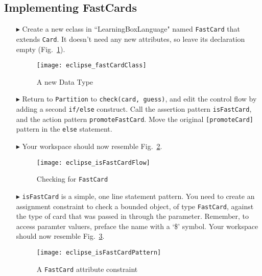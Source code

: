 \newpage
\subsection{Implementing FastCards}
\texHeader
\hypertarget{fastCard tex}{}

\begin{itemize}
  
\item[$\blacktriangleright$] Create a new eclass in ``LearningBoxLanguage" named \texttt{FastCard} that extends \texttt{Card}. It doesn't need any new
attributes, so leave its declaration empty (Fig.~\ref{fig:fastClass}).

\begin{figure}[htp]
\begin{center}
  \texttt{[image: eclipse\_fastCardClass]}
  \caption{A new Data Type}
  \label{fig:fastClass}
\end{center}
\end{figure}

\item[$\blacktriangleright$] Return to \texttt{Partition} to \texttt{check(card, guess)}, and edit the control flow by adding a second \texttt{if/else}
construct. Call the assertion pattern \texttt{isFastCard}, and the action pattern \texttt{promoteFastCard}. Move the original \texttt{[promoteCard]} pattern in
the \texttt{else} statement.

\item[$\blacktriangleright$] Your workspace should now resemble Fig.~\ref{fig:isFastCard}.

\begin{figure}[htp]
\begin{center}
  \texttt{[image: eclipse\_isFastCardFlow]}
  \caption{Checking for \texttt{FastCard}}
  \label{fig:isFastCard}
\end{center}
\end{figure}

\item[$\blacktriangleright$] \texttt{isFastCard} is a simple, one line statement pattern. You need to create an assignment constraint to check a bounded object,
of type \texttt{FastCard}, against the type of card that was passed in through the parameter. Remember, to access paramter valuers, preface the name with a `\$'
symbol. Your workspace should now resemble Fig.~\ref{fig:isFastCardPattern}.

\begin{figure}[htp]
\begin{center}
  \texttt{[image: eclipse\_isFastCardPattern]}
  \caption{A \texttt{FastCard} attribute constraint}
  \label{fig:isFastCardPattern}
\end{center}
\end{figure}


\end{itemize}
